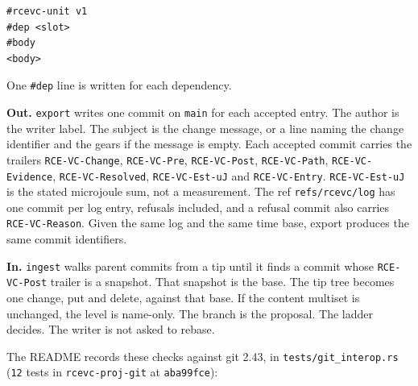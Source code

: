 \documentclass[10pt,letterpaper]{article}
\begin{document}
\begin{verbatim}
#rcevc-unit v1
#dep <slot>
#body
<body>
\end{verbatim}

One \texttt{\#dep} line is written for each dependency.

\textbf{Out.} \texttt{export} writes one commit on \texttt{main} for
each accepted entry. The author is the writer label. The subject is the
change message, or a line naming the change identifier and the gears if
the message is empty. Each accepted commit carries the trailers
\texttt{RCE-VC-Change}, \texttt{RCE-VC-Pre}, \texttt{RCE-VC-Post},
\texttt{RCE-VC-Path}, \texttt{RCE-VC-Evidence},
\texttt{RCE-VC-Resolved}, \texttt{RCE-VC-Est-uJ} and
\texttt{RCE-VC-Entry}. \texttt{RCE-VC-Est-uJ} is the stated microjoule
sum, not a measurement. The ref \texttt{refs/rcevc/log} has one commit
per log entry, refusals included, and a refusal commit also carries
\texttt{RCE-VC-Reason}. Given the same log and the same time base,
export produces the same commit identifiers.

\textbf{In.} \texttt{ingest} walks parent commits from a tip until it
finds a commit whose \texttt{RCE-VC-Post} trailer is a snapshot. That
snapshot is the base. The tip tree becomes one change, put and delete,
against that base. If the content multiset is unchanged, the level is
name-only. The branch is the proposal. The ladder decides. The writer is
not asked to rebase.

The README records these checks against git 2.43, in
\texttt{tests/\allowbreak{}git\_\allowbreak{}interop.\allowbreak{}rs} (\texttt{12} tests in
\texttt{rcevc-proj-git} at \texttt{aba99fce}):
\end{document}
